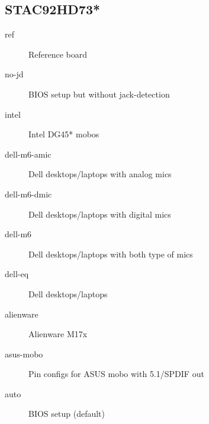 \documentclass[a4paper,8pt,english]{sphinxmanual}
\begin{document}
\subsection{STAC92HD73*}
\label{sound/hd-audio/models:stac92hd73}\begin{description}
\item[{ref}] \leavevmode
Reference board

\item[{no-jd}] \leavevmode
BIOS setup but without jack-detection

\item[{intel}] \leavevmode
Intel DG45* mobos

\item[{dell-m6-amic}] \leavevmode
Dell desktops/laptops with analog mics

\item[{dell-m6-dmic}] \leavevmode
Dell desktops/laptops with digital mics

\item[{dell-m6}] \leavevmode
Dell desktops/laptops with both type of mics

\item[{dell-eq}] \leavevmode
Dell desktops/laptops

\item[{alienware}] \leavevmode
Alienware M17x

\item[{asus-mobo}] \leavevmode
Pin configs for ASUS mobo with 5.1/SPDIF out

\item[{auto}] \leavevmode
BIOS setup (default)

\end{description}
\end{document}
